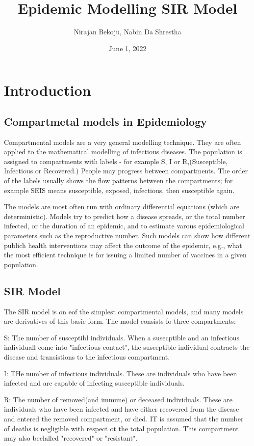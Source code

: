 \documentclass[a4paper, 12pt]{article}
\title{Epidemic Modelling SIR Model}
\author{Nirajan Bekoju, Nabin Da Shrestha}
\date{June 1, 2022}
\begin{document}
  
\maketitle
\clearpage

\tableofcontents
\clearpage

\section{Introduction}
\subsection{Compartmetal models in Epidemiology}
Compartmental models are a very general modelling technique. They are often applied to the mathematical modelling of infectious diseases. The population is assigned to compartments with labels - for example S, I or R,(Susceptible, Infectious or Recovered.) People may progress between compartments. The order of the labels usually shows the flow patterns between the compartments; for example SEIS means susceptible, exposed, infectious, then susceptible again.

The models are most often run with ordinary differential equations (which are deterministic). Models try to predict how a disease spreads, or the total number infected, or the duration of an epidemic, and to estimate varous epidemiological parameters such as the reproductive number. Such models can show how different publich health interventions may affect the outcome of the epidemic, e.g., what the most efficient technique is for issuing a limited number of vaccines in a given population. 

\subsection{SIR Model}
The SIR model is on eof the simplest compartmental models, and many models are derivatives of this basic form. The model consists fo three compartments:-

S: The number of susceptibl individuals. When a susecptible and an infectious individuall come into "infectious contact", the susceptible individual contracts the disease and transistions to the infectious compartment.

I: THe number of infectious individuals. These are individuals who have been infected and are capable of infecting susceptible individuals.

R: The number of removed(and immune) or deceased individuals. These are individuals who have been infected and have either recovered from the disease and entered the removed compartment, or died. IT is assumed that the number of deaths is negligible with respect ot the total population. This compartment may also beclalled "recovered" or "resistant".
\end{document}
